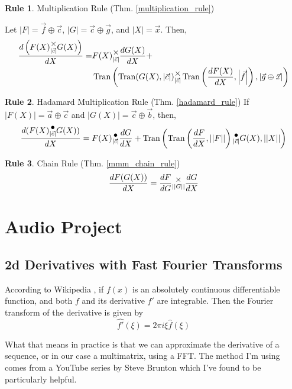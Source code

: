\documentclass[12pt]{book}
\theoremstyle{plain}
\theoremstyle{definition}
\newtheorem{drule}{Rule}
\theoremstyle{ppart}
\theoremstyle{case}
\theoremstyle{solution}
\DeclareMathOperator{\Tran}{Tran}
\newcommand{\mmult}[1]{\text{\raisebox{1ex}{$\underset{#1}{\times}$}}}
\newcommand{\dmult}[1]{\text{\raisebox{1ex}{$\underset{#1}{\,\bullet\,}$}}}
\newcommand{\shape}[1]{\left|#1\right|}
\begin{document}
\begin{appendices}
\begin{drule}
Multiplication Rule
(Thm. \ref{multiplication_rule})

Let $\shape{F} = \vec{f} \oplus \vec{c}$, $\shape{G} = \vec{c} \oplus \vec{g}$,
and $\shape{X} = \vec{x}$. Then,
\begin{align*}
 \frac{d\left(F(X) \mmult{\shape{\vec{c}}} G(X)\right)}{dX} =&
 F(X) \mmult{\shape{\vec{c}}} \frac{dG(X)}{dX} + \\
 &\Tran\left(
   \Tran(G(X), \shape{\vec{c}})
     \mmult{\shape{\vec{c}}}
   \Tran\left(\frac{dF(X)}{dX}, \shape{\vec{f}}\right),
   \shape{\vec{g} \oplus \vec{x}}
 \right)
\end{align*}
\end{drule}

\begin{drule}
Hadamard Multiplication Rule
(Thm. \ref{hadamard_rule})
If $\shape{F(X)} = \vec{a} \oplus \vec{c}$ and $\shape{G(X)} = \vec{c} \oplus \vec{b}$, then,
\[
  \frac{d(F(X) \dmult{\shape{\vec{c}}} G(X))}{dX} =
    F(X) \dmult{\shape{\vec{c}}} \frac{dG}{dX} +
    \Tran\left(\Tran\left(\frac{dF}{dX}, \shape{\shape{F}}\right) \dmult{\shape{\vec{c}}} G(X), \shape{\shape{X}}\right)
\]
\end{drule}

\begin{drule}
Chain Rule
(Thm. \ref{mmm_chain_rule})
\[ \frac{dF(G(X))}{dX} = \frac{dF}{dG} \mmult{\shape{\shape{G}}} \frac{dG}{dX} \]
\end{drule}

\chapter{Audio Project}

\begin{landscape}
\section{2d Derivatives with Fast Fourier Transforms}

According to Wikipedia \cite{wiki:fourier}, if $f(x)$ is an absolutely continuous differentiable function, and both $f$ and its derivative $f'$ are integrable. Then the Fourier transform of the derivative is given by
\[ \hat{f'}(\xi) = 2 \pi i \xi \hat{f}(\xi) \]

What that means in practice is that we can approximate the derivative of a sequence, or in our case a multimatrix, using a FFT.
The method I'm using comes from a YouTube series by Steve Brunton \cite{youtube:fourier} which I've found to be particularly helpful.


\end{landscape}
\end{appendices}
\end{document}
